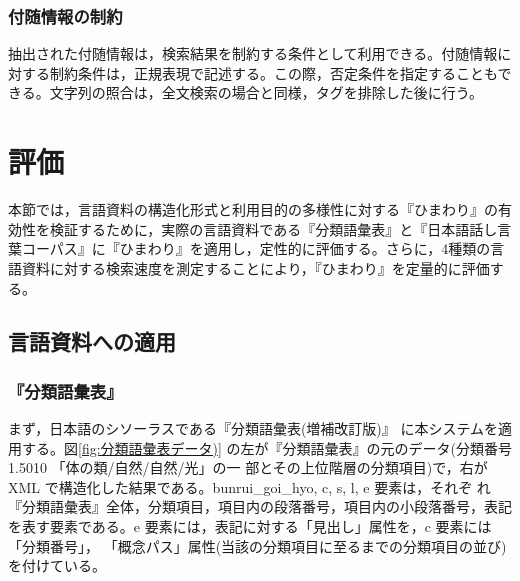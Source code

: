 \subsubsection{付随情報の制約}
抽出された付随情報は，検索結果を制約する条件として利用できる。付随情報に
対する制約条件は，正規表現で記述する。この際，否定条件を指定することもで
きる。文字列の照合は，全文検索の場合と同様，タグを排除した後に行う。


\section{評価}
本節では，言語資料の構造化形式と利用目的の多様性に対する『ひまわり』の有
効性を検証するために，実際の言語資料である『分類語彙表』と『日本語話し言
葉コーパス』に『ひまわり』を適用し，定性的に評価する。さらに，4種類の言
語資料に対する検索速度を測定することにより，『ひまわり』を定量的に評価す
る。

\subsection{言語資料への適用}
\subsubsection{『分類語彙表』}
まず，日本語のシソーラスである『分類語彙表(増補改訂版)』
に本システムを適用する。図\ref{fig:分類語彙表データ)}
の左が『分類語彙表』の元のデータ(分類番号 1.5010 「体の類/自然/自然/光」の一
部とその上位階層の分類項目)で，右が XML で構造化した結果である。bunrui\_goi\_hyo, c, s, l, e 要素は，それぞ
れ『分類語彙表』全体，分類項目，項目内の段落番号，項目内の小段落番号，表記を表す要素である。e 要素には，表記に対する「見出し」属性を，c 要素には「分類番号」，
「概念パス」属性(当該の分類項目に至るまでの分類項目の並び)を付けている。


